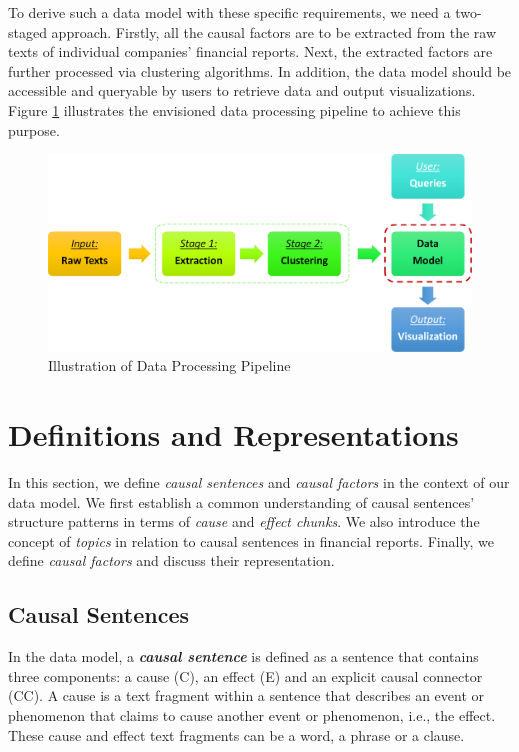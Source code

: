 \documentclass [
     12pt,         %
     a4paper,      %
     BCOR10mm,     %
     DIV14,        %
     liststotoc,   %
     bibtotoc,     %
     idxtotoc,     %
     parskip       %
     ]{scrreprt}
\begin{document}
To derive such a data model with these specific requirements, we need a two-staged approach. Firstly, all the causal factors are to be extracted from the raw texts of individual companies' financial reports. Next, the extracted factors are further processed via clustering algorithms. In addition, the data model should be accessible and queryable by users to retrieve data and output visualizations. Figure \ref{fig:pipeline} illustrates the envisioned data processing pipeline to achieve this purpose.  

\begin{figure}[h!]
\centering
  \includegraphics[scale=1.4]{figures/Pipeline_0.png}
  \caption{Illustration of Data Processing Pipeline}
  \label{fig:pipeline}
\end{figure}



\section{Definitions and Representations} \label{sec:causalrepresenation}

In this section, we define \emph{causal sentences} and \emph{causal factors} in the context of our data model. We first establish a common understanding of causal sentences' structure patterns in terms of \emph{cause} and \emph{effect chunks}. We also introduce the concept of \emph{topics} in relation to causal sentences in financial reports. Finally, we define \emph{causal factors} and discuss their representation. 

\subsection{Causal Sentences}
In the data model, a \emph{\textbf{causal sentence}} is defined as a sentence that contains three components: a cause (C), an effect (E) and an explicit causal connector (CC). A cause is a text fragment within a sentence that describes an event or phenomenon that claims to cause another event or phenomenon, i.e., the effect. These cause and effect text fragments can be a word, a phrase or a clause. 
\end{document}
